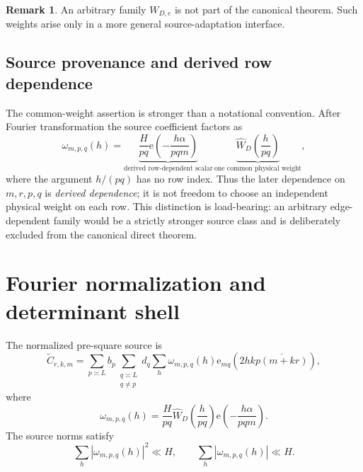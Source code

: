 \documentclass[11pt]{article}
\theoremstyle{definition}
\newtheorem{remark}[remark]{Remark}
\newcommand{\e}{\mathrm e}
\newcommand{\1}{\mathbf 1}
\begin{document}
\begin{remark}
An arbitrary family $W_{D,e}$ is not part of the canonical theorem. Such
weights arise only in a more general source-adaptation interface.
\end{remark}

\subsection{Source provenance and derived row dependence}
The common-weight assertion is stronger than a notational convention.  After
Fourier transformation the source coefficient factors as
\begin{equation}
  \omega_{m,p,q}(h)
  = \underbrace{\frac{H}{pq}
      \e\!\left(-\frac{h\alpha}{pqm}\right)}_{\text{derived row-dependent scalar}}
    \,\underbrace{\widehat W_D\!\left(\frac{h}{pq}\right)}_{\text{one common physical weight}},
  \label{eq:common-weight-factor}
\end{equation}
where the argument $h/(pq)$ has no row index.  Thus the later dependence on
$m,r,p,q$ is \emph{derived dependence}; it is not freedom to choose an
independent physical weight on each row.  This distinction is load-bearing:
an arbitrary edge-dependent family would be a strictly stronger source class
and is deliberately excluded from the canonical direct theorem.

\section{Fourier normalization and determinant shell}
The normalized pre-square source is
\begin{equation}
 \widetilde C_{r,k,m}
   =\sum_{p\asymp L}b_p
    \sum_{\substack{q\asymp L\\q\ne p}}d_q
    \sum_h\omega_{m,p,q}(h)
    \e_{mq}\!\left(2hk\overline{p(m+kr)}\right),
 \label{eq:Ctilde}
\end{equation}
where
\begin{equation}
   \omega_{m,p,q}(h)
   =\frac{H}{pq}\widehat W_D\!\left(\frac{h}{pq}\right)
    \e\!\left(-\frac{h\alpha}{pqm}\right).
   \label{eq:omega}
\end{equation}
The source norms satisfy
\[
   \sum_h|\omega_{m,p,q}(h)|^2\ll H,\qquad
   \sum_h|\omega_{m,p,q}(h)|\ll H.
\]
\end{document}
